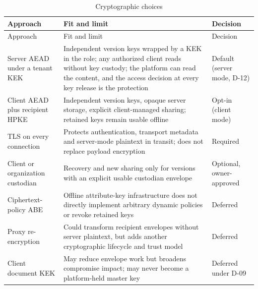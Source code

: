 \begin{longtable}{@{}P{0.23\textwidth}P{0.43\textwidth}P{0.20\textwidth}@{}}
\caption{Cryptographic choices}\label{tab:abe}\\
\toprule Approach & Fit and limit & Decision\\\midrule\endfirsthead
\toprule Approach & Fit and limit & Decision\\\midrule\endhead
Server AEAD under a tenant KEK & Independent version keys wrapped by a KEK in the  role; any authorized client reads without key custody; the platform can read the content, and the access decision at every key release is the protection & Default (server mode, D-12)\\
Client AEAD plus recipient HPKE & Independent version keys, opaque server storage, explicit client-managed sharing; retained keys remain usable offline & Opt-in (client mode)\\
TLS on every connection & Protects authentication, transport metadata and server-mode plaintext in transit; does not replace payload encryption & Required\\
Client or organization custodian & Recovery and new sharing only for versions with an explicit usable custodian envelope & Optional, owner-approved\\
Ciphertext-policy ABE & Offline attribute-key infrastructure does not directly implement arbitrary dynamic policies or revoke retained keys & Deferred\\
Proxy re-encryption & Could transform recipient envelopes without server plaintext, but adds another cryptographic lifecycle and trust model & Deferred\\
Client document KEK & May reduce envelope work but broadens compromise impact; may never become a platform-held master key & Deferred under D-09\\
\bottomrule
\end{longtable}
